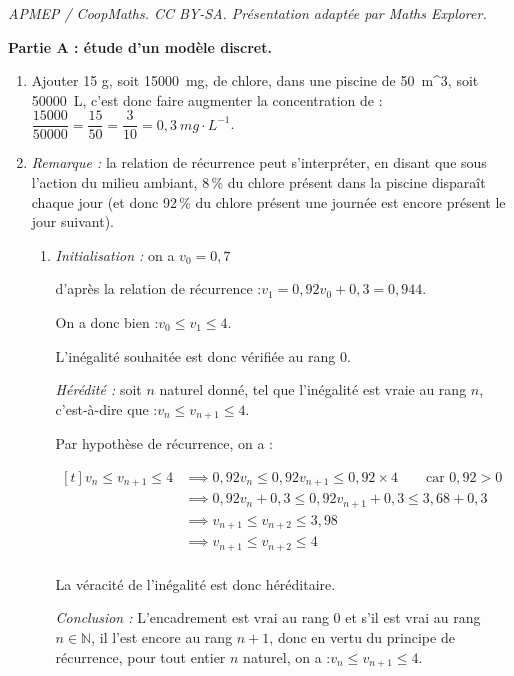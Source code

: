 \documentclass[10pt]{article}
\providecommand{\N}{\mathbb{N}}
\providecommand{\np}[2][]{{#2~#1}}
\begin{document}
\noindent\textit{APMEP / CoopMaths. CC BY-SA. Présentation adaptée par Maths Explorer.}\par\medskip
\medskip

\textbf{Partie A : étude d'un modèle discret.}

\smallskip

\begin{enumerate}
	\item Ajouter 15 g, soit \np[mg]{15000}, de chlore, dans une piscine de \np[m^3]{50}, soit \np[L]{50000}, c'est donc faire augmenter la concentration de :\quad$\dfrac{15000}{50000} =\dfrac{15}{50}= \dfrac{3}{10} = \np[mg\cdot L^{-1}]{0,3}$.

	\item \emph{Remarque :} la relation de récurrence peut s'interpréter, en disant que sous l'action du milieu ambiant, 8\,\% du chlore présent dans la piscine disparaît chaque jour (et donc 92\,\% du chlore présent une journée est encore présent le jour suivant).
	\begin{enumerate}
		\item \emph{Initialisation :} on a \quad $v_0 = 0,7$

		d'après la relation de récurrence :\quad $v_1 = 0,92v_0 + 0,3 = 0,944$.

		On a donc bien :\quad $v_0 \leqslant v_1 \leqslant 4$.

		L'inégalité souhaitée est donc vérifiée au rang 0.

		\smallskip

		\emph{Hérédité :} soit $n$ naturel donné, tel que l'inégalité est vraie au rang $n$, c'est-à-dire que :\quad $v_n \leqslant v_{n+1}\leqslant 4$.

Par hypothèse de récurrence, on a :

$\begin{aligned}[t] v_n \leqslant v_{n+1}\leqslant 4 &\implies 0,92 v_n \leqslant 0,92v_{n+1} \leqslant 0,92 \times 4\qquad\text{car } 0,92 >0\\
		&\implies 0,92 v_n + 0,3 \leqslant 0,92v_{n+1}+ 0,3 \leqslant 3,68 + 0,3 \\
		&\implies v_{n+1} \leqslant v_{n+2}  \leqslant 3,98 \\
		&\implies v_{n+1} \leqslant v_{n+2}  \leqslant 4\\
		\end{aligned}$

La véracité de l'inégalité est donc héréditaire.

\emph{Conclusion :} L'encadrement est vrai au rang 0 et s'il est vrai au rang $n \in \N$, il l'est encore au rang $n + 1$, donc en vertu du principe de récurrence, pour tout entier $n$ naturel, on a :\quad $v_n \leqslant v_{n+1} \leqslant 4$.


\end{enumerate}
\end{enumerate}
\end{document}
